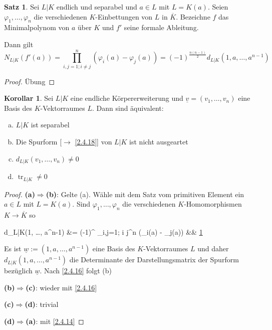 \documentclass[
twoside=semi,
fontsize=12,
DIV=12, 
cleardoublepage=current,
leqno,
headings=optiontoheadandtoc, 
toc=idx
]{scrbook}
\DeclareMathOperator{\tr}{tr}
\theoremstyle{definition}
\newtheorem{satz}[definition]{Satz}
\newtheorem{korollar}[definition]{Korollar}
\begin{document}
	\begin{satz}\label{2.4.22}\hfill\newline
		Sei $L|K$ endlich und separabel und $a \in L$ mit $L=K(a)$. Seien $\varphi_1, \dots, \varphi_n$ die verschiedenen $K$-Einbettungen von $L$ in $\overline{K}$. Bezeichne $f$ das Minimalpolynom von $a$ \"uber $K$ und $f'$ seine formale Ableitung.
		
		Dann gilt 
			\[N_{L|K}(f'(a)) = \prod_{i,j=1; i \neq j}^n (\varphi_i(a)- \varphi_j(a)) = (-1)^{\frac{n(n-1)}{2}}d_{L|K}(1,a,\dots, a^{n-1}) \]
			
		\begin{proof}
			\"Ubung
		\end{proof} 
	\end{satz}

	\begin{korollar}\label{2.4.23}\hfill\newline
		Sei $L|K$ eine endliche K\"orpererweiterung und $\underline{v} =(v_1, \dots, v_n)$ eine Basis des $K$-Vektorraumes $L$. Dann sind \"aquivalent:
		\begin{enumerate}[(a)]
			\item $L|K$ ist separabel
			\item Die Spurform [$\to$ \ref{2.4.18}] von $L|K$ ist nicht ausgeartet
			\item $d_{L|K}(v_1, \dots, v_n) \neq 0$
			\item $\tr_{L|K} \neq 0$
		\end{enumerate}
	
		\begin{proof}\hfill\newline
			\textbf{(a)$\Longrightarrow$(b)}: Gelte (a). W\"ahle mit dem Satz vom primitiven Element ein $a \in L$ mit $L= K(a)$. Sind $\varphi_1, \dots, \varphi_n$ die verschiedenen $K$-Homomorphismen $K \to \overline{K}$ so 
			\begin{flalign*}
				d_{L|K}(1, \dots, a^{n-1}) &= (-1)^{} \prod_{i,j=1; i \neq j}^{n} (\varphi_i(a) - \varphi_j(a)) && \ref{2.4.22}
			\end{flalign*}
		
			Es ist $\underline{w} := (1, a, \dots, a^{n-1})$ eine Basis des $K$-Vektorraumes $L$ und daher $d_{L|K}(1, a, \dots, a^{n-1})$ die Determinante der Darstellungsmatrix der Spurform bez\"uglich $\underline{w}$. Nach \ref{2.4.16} folgt (b)
			
			
			\medskip\noindent 
			\textbf{(b)$\Longrightarrow$(c)}: wieder mit \ref{2.4.16}
			
			\medskip\noindent
			\textbf{(c)$\Longrightarrow$(d)}: trivial
			
			\medskip\noindent
			\textbf{(d)$\Longrightarrow$(a)}: mit \ref{2.4.14}
		\end{proof}
 	\end{korollar}
 
\end{document}
